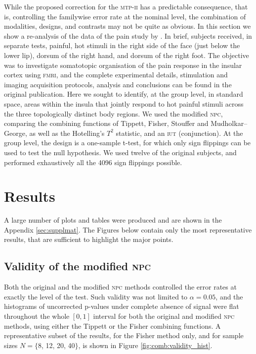 While the proposed correction for the \textsc{mtp-ii} has a predictable consequence, that is, controlling the familywise error rate at the nominal level, the combination of modalities, designs, and contrasts may not be quite as obvious. In this section we show a re-analysis of the data of the pain study by \citet{Brooks2005}. In brief, subjects received, in separate tests, painful, hot stimuli in the right side of the face (just below the lower lip), dorsum of the right hand, and dorsum of the right foot. The objective was to investigate somatotopic organisation of the pain response in the insular cortex using \textsc{fmri}, and the complete experimental details, stimulation and imaging acquisition protocols, analysis and conclusions can be found in the original publication. Here we sought to identify, at the group level, in standard space, areas within the insula that jointly respond to hot painful stimuli across the three topologically distinct body regions. We used the modified \textsc{npc}, comparing the combining functions of Tippett, Fisher, Stouffer and Mudholkar--George, as well as the Hotelling's $T^2$ statistic, and an \textsc{iut} (conjunction). At the group level, the design is a one-sample t-test, for which only sign flippings can be used to test the null hypothesis. We used twelve of the original subjects, and performed exhaustively all the 4096 sign flippings possible.

\section{Results}

A large number of plots and tables were produced and are shown in the Appendix \ref{sec:supplmat}. The Figures below contain only the most representative results, that are sufficient to highlight the major points.

\subsection{Validity of the modified \textsc{npc}}

Both the original and the modified \textsc{npc} methods controlled the error rates at exactly the level of the test. Such validity was not limited to $\alpha=0.05$, and the histograms of uncorrected p-values under complete absence of signal were flat throughout the whole $[0, 1]$ interval for both the original and modified \textsc{npc} methods, using either the Tippett or the Fisher combining functions. A representative subset of the results, for the Fisher method only, and for sample sizes $N = \{$8, 12, 20, 40$\}$, is shown in Figure \ref{fig:comb:validity_hist}.

